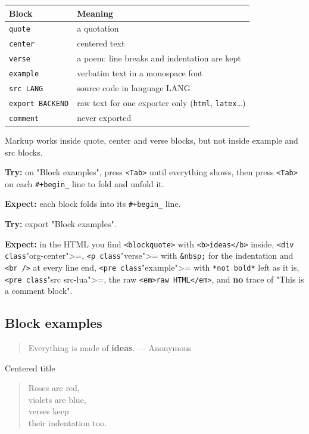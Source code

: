 \begin{center}
\begin{tabular}{ll}
Block & Meaning\\
\hline
\texttt{quote} & a quotation\\
\texttt{center} & centered text\\
\texttt{verse} & a poem: line breaks and indentation are kept\\
\texttt{example} & verbatim text in a monospace font\\
\texttt{src LANG} & source code in language LANG\\
\texttt{export BACKEND} & raw text for one exporter only (\texttt{html}, \texttt{latex}\ldots{})\\
\texttt{comment} & never exported\\
\end{tabular}
\end{center}

Markup works inside quote, center and verse blocks, but not inside example
and src blocks.

\textbf{Try:} on "Block examples", press \texttt{<Tab>} until everything shows, then
press \texttt{<Tab>} on each \texttt{\#+begin\_} line to fold and unfold it.

\textbf{Expect:} each block folds into its \texttt{\#+begin\_} line.

\textbf{Try:} export "Block examples".

\textbf{Expect:} in the HTML you find \texttt{<blockquote>} with \texttt{<b>ideas</b>} inside,
\texttt{<div class}"org-center">=, \texttt{<p class}"verse">= with \texttt{\&nbsp;} for the
indentation and \texttt{<br />} at every line end, \texttt{<pre class}"example">= with
\texttt{*not bold*} left as it is, \texttt{<pre class}"src src-lua">=, the raw
\texttt{<em>raw HTML</em>}, and \textbf{no} trace of "This is a comment block".
\subsection{Block examples}
\label{sec:org15303e2}
\begin{quote}
Everything is made of \textbf{ideas}. --- Anonymous
\end{quote}

\begin{center}
Centered title
\end{center}

\begin{verse}
Roses are red,\\
\hspace*{2\fontdimen2\font}violets are blue,\\
\hspace*{4\fontdimen2\font}verses keep\\
\hspace*{6\fontdimen2\font}their indentation too.\\
\end{verse}

